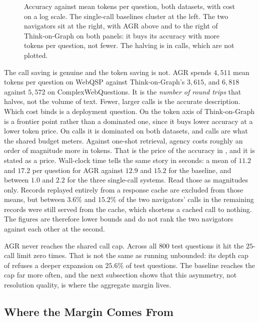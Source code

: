 \begin{figure}[!tb]
  \begin{center}
    
  \end{center}
  \caption{Accuracy against mean tokens per question, both datasets,
    with cost on a log scale. The single-call baselines cluster at the
    left. The two navigators sit at the right, with AGR above and to
    the right of Think-on-Graph on both panels: it buys its accuracy
    with more tokens per question, not fewer. The halving is in calls,
    which are not plotted.}
  \label{fig:accuracycost}
\end{figure}

The call saving is genuine and the token saving is not. AGR spends
$4{,}511$ mean tokens per question on WebQSP against Think-on-Graph's
$3{,}615$, and $6{,}818$ against $5{,}572$ on ComplexWebQuestions. It is
the \emph{number of round trips} that halves, not the volume of text.
Fewer, larger calls is the accurate description. Which cost binds is a
deployment question. On the token axis of 
Think-on-Graph is a frontier point rather than a dominated one, since it
buys lower accuracy at a lower token price. On calls it is dominated on
both datasets, and calls are what the shared budget meters. Against
one-shot retrieval, agency costs roughly an order of magnitude more in
tokens. That is the price of the accuracy in , and it is
stated as a price. Wall-clock time tells the same story in seconds: a
mean of $11.2$ and $17.2$ per question for AGR against $12.9$ and $15.2$
for the baseline, and between $1.0$ and $2.2$ for the three single-call
systems. Read those as magnitudes only. Records replayed entirely from a
response cache are excluded from those means, but between $3.6\%$ and
$15.2\%$ of the two navigators' calls in the remaining records were
still served from the cache, which shortens a cached call to nothing.
The figures are therefore lower bounds and do not rank the two
navigators against each other at the second.

AGR never reaches the shared call cap. Across all $800$ test questions
it hit the $25$-call limit zero times. That is not the same as running
unbounded: its depth cap of  refuses a deeper expansion
on $25.6\%$ of test questions. The baseline reaches the cap far more
often, and the next subsection shows that this asymmetry, not resolution
quality, is where the aggregate margin lives.

\subsection{Where the Margin Comes From}\label{sec:margin}

